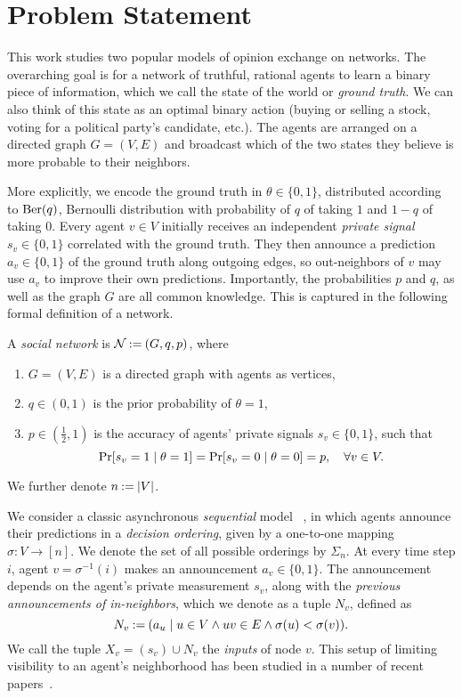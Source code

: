 \section{Problem Statement}
\label{sec:problem}

This work studies two popular models of opinion exchange on networks. The overarching goal is for a network of truthful, rational agents to learn a binary piece of information, which we call the state of the world or \emph{ground truth}. We can also think of this state as an optimal binary action (buying or selling a stock, voting for a political party's candidate, etc.). The agents are arranged on a directed graph $G=(V,E)$ and broadcast which of the two states they believe is more probable to their neighbors. 

More explicitly, we encode the ground truth in $ \theta \in \{0,1\} $, distributed according to $ \operatorname{Ber}\!\left(q\right) $, Bernoulli distribution with probability of $q$ of taking $1$ and $1-q$ of taking $0$. Every agent $v \in V$ initially receives an independent \emph{private signal} $ s_v \in \{0,1\}$ correlated with the ground truth. They then announce a prediction $a_v \in \{ 0,1 \} $ of the ground truth along outgoing edges, so out-neighbors of $v$ may use $a_v$ to improve their own predictions. Importantly, the probabilities $p$ and $q$, as well as the graph $G$ are all common knowledge. 
This is captured in the following formal definition of a network.

\begin{definition}
    A \emph{social network} is $ \mathcal{N} \mathbin{:=} ( G,q,p ) $,
    where \begin{enumerate}
        \item $ G = ( V,E ) $ is a directed graph with agents as vertices,
        \item $ q \in ( 0,1 ) $ is the prior probability of $\theta = 1$,
        \item $ p \in ( \frac 12, 1 ) $ is the accuracy of agents' private signals $s_v \in \{0,1\}$, such that \[\Pr\!\left[ s_v = 1 \;\vert\; \theta = 1 \right] = \Pr\!\left[ s_v = 0 \;\vert\; \theta = 0 \right] = p, \quad \forall v \in V.
            \]
    \end{enumerate}
    We further denote $ n \mathbin{:=} \left\lvert V \right\rvert $.
\end{definition}

We consider a classic asynchronous \emph{sequential} model ~\cite{Golub2017-qo}, in which agents announce their predictions in a \emph{decision ordering}, given by a one-to-one mapping $\sigma: V \to [n]$.
We denote the set of all possible orderings by $\Sigma_n$.
At every time step $i$, agent $v = \sigma^{-1}(i)$ makes an announcement $a_v \in \{0,1\}$.
The announcement depends on the agent's private measurement $ s_v $, along with the \emph{previous announcements of in-neighbors}, which we denote as a tuple $ N_v $, defined as \[
    N_v \mathbin{:=} ( a_u \;\vert\; u \in V \land uv \in E \land \sigma(u)<\sigma(v) ).
\] 
We call the tuple $X_v = (s_v) \cup N_v$ the \emph{inputs} of node $v$. 
This setup of limiting visibility to an agent's neighborhood has been studied in a number of recent papers~\cite{Bahar2020-am,arieli2020social,lu24enabling}.

